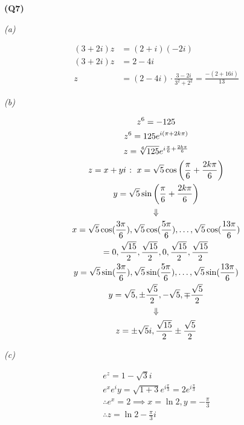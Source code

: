 \documentclass[12pt, a4paper]{article}
\begin{document}
\textbf{(Q7)}

\textit{(a)}

\begin{align*}
    (3 + 2i)z & = (2 + i)(-2i)\\
    (3 + 2i)z & = 2 - 4i\\
    z & = (2 - 4i) \cdot \frac{3 -2i}{3^2 + 2^2} = \frac{-(2 + 16i)}{13}
\end{align*}

\textit{(b)}

\begin{gather*}
    z^6  = -125\\
    z^6 = 125e^{i(\pi + 2k\pi)}\\
    z  = \sqrt[6]{125}e^{i\frac{\pi}{6} + \frac{2k\pi}{6}}\\
    z  = x + yi \; \colon \;  x = \sqrt{5} \cos \left(\frac{\pi}{6} + \frac{2k\pi}{6}\right)\\
    y = \sqrt{5} \sin \left(\frac{\pi}{6} + \frac{2k\pi}{6}\right)\\
    \Downarrow\\
    x = \sqrt{5}\cos(\frac{3\pi}{6}), \sqrt{5}\cos(\frac{5\pi}{6}),
    \ldots, \sqrt{5}\cos(\frac{13\pi}{6})\\
    = 0, \frac{\sqrt{15}}{2}, \frac{\sqrt{15}}{2}, 0, \frac{\sqrt{15}}{2},
    \frac{\sqrt{15}}{2}\\
    y = \sqrt{5}\sin(\frac{3\pi}{6}), \sqrt{5}\sin(\frac{5\pi}{6}),
    \ldots, \sqrt{5}\sin(\frac{13\pi}{6})\\
    y = \sqrt{5}, \pm\frac{\sqrt{5}}{2}, -\sqrt{5}, \mp\frac{\sqrt{5}}{2}\\
    \Downarrow\\
    z = \pm\sqrt{5}i, \frac{\sqrt{15}}{2} \pm \frac{\sqrt{5}}{2}
\end{gather*}

\textit{(c)}

\begin{gather*}
    e^z = 1 - \sqrt{3}i\\
    e^x e^iy = \sqrt{1 + 3}e^{i\frac{\pi}{3}} = 2e^{i\frac{\pi}{3}}\\
    \therefore e^x = 2 \implies x = \ln 2, y = -\frac{\pi}{3}\\
    \therefore z = \ln 2 - \frac{\pi}{3}i
\end{gather*}
\end{document}
